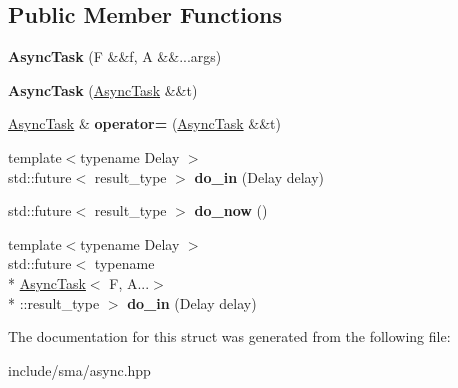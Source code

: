 \subsection*{Public Member Functions}
\begin{DoxyCompactItemize}
\item 
\hypertarget{structsma_1_1AsyncTask_ab4115ad8a8656927f5c0101ca156d285}{{\bfseries Async\-Task} (F \&\&f, A \&\&...args)}\label{structsma_1_1AsyncTask_ab4115ad8a8656927f5c0101ca156d285}

\item 
\hypertarget{structsma_1_1AsyncTask_a4dbf42e95a13f8e311083e6fb2dd0191}{{\bfseries Async\-Task} (\hyperlink{structsma_1_1AsyncTask}{Async\-Task} \&\&t)}\label{structsma_1_1AsyncTask_a4dbf42e95a13f8e311083e6fb2dd0191}

\item 
\hypertarget{structsma_1_1AsyncTask_a3dcd19e457ad82875ef15b1846574130}{\hyperlink{structsma_1_1AsyncTask}{Async\-Task} \& {\bfseries operator=} (\hyperlink{structsma_1_1AsyncTask}{Async\-Task} \&\&t)}\label{structsma_1_1AsyncTask_a3dcd19e457ad82875ef15b1846574130}

\item 
\hypertarget{structsma_1_1AsyncTask_a9d9902495f9b8b02911d83d81bef5a44}{{\footnotesize template$<$typename Delay $>$ }\\std\-::future$<$ result\-\_\-type $>$ {\bfseries do\-\_\-in} (Delay delay)}\label{structsma_1_1AsyncTask_a9d9902495f9b8b02911d83d81bef5a44}

\item 
\hypertarget{structsma_1_1AsyncTask_a01847bbf15f739c525dc014cf750d842}{std\-::future$<$ result\-\_\-type $>$ {\bfseries do\-\_\-now} ()}\label{structsma_1_1AsyncTask_a01847bbf15f739c525dc014cf750d842}

\item 
\hypertarget{structsma_1_1AsyncTask_a77b3df2fe421a69a8df41618dbe167d3}{{\footnotesize template$<$typename Delay $>$ }\\std\-::future$<$ typename \\*
\hyperlink{structsma_1_1AsyncTask}{Async\-Task}$<$ F, A...$>$\\*
\-::result\-\_\-type $>$ {\bfseries do\-\_\-in} (Delay delay)}\label{structsma_1_1AsyncTask_a77b3df2fe421a69a8df41618dbe167d3}

\end{DoxyCompactItemize}


The documentation for this struct was generated from the following file\-:\begin{DoxyCompactItemize}
\item 
include/sma/async.\-hpp\end{DoxyCompactItemize}
